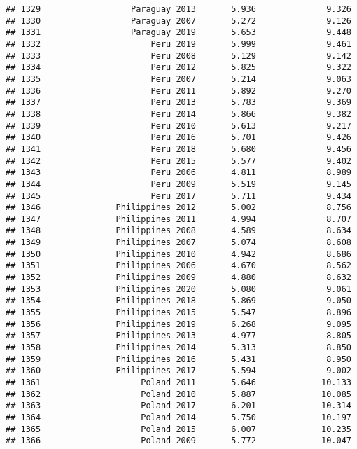 \documentclass[
]{article}
\begin{document}
\begin{verbatim}
## 1329                  Paraguay 2013       5.936              9.326
## 1330                  Paraguay 2007       5.272              9.126
## 1331                  Paraguay 2019       5.653              9.448
## 1332                      Peru 2019       5.999              9.461
## 1333                      Peru 2008       5.129              9.142
## 1334                      Peru 2012       5.825              9.322
## 1335                      Peru 2007       5.214              9.063
## 1336                      Peru 2011       5.892              9.270
## 1337                      Peru 2013       5.783              9.369
## 1338                      Peru 2014       5.866              9.382
## 1339                      Peru 2010       5.613              9.217
## 1340                      Peru 2016       5.701              9.426
## 1341                      Peru 2018       5.680              9.456
## 1342                      Peru 2015       5.577              9.402
## 1343                      Peru 2006       4.811              8.989
## 1344                      Peru 2009       5.519              9.145
## 1345                      Peru 2017       5.711              9.434
## 1346               Philippines 2012       5.002              8.756
## 1347               Philippines 2011       4.994              8.707
## 1348               Philippines 2008       4.589              8.634
## 1349               Philippines 2007       5.074              8.608
## 1350               Philippines 2010       4.942              8.686
## 1351               Philippines 2006       4.670              8.562
## 1352               Philippines 2009       4.880              8.632
## 1353               Philippines 2020       5.080              9.061
## 1354               Philippines 2018       5.869              9.050
## 1355               Philippines 2015       5.547              8.896
## 1356               Philippines 2019       6.268              9.095
## 1357               Philippines 2013       4.977              8.805
## 1358               Philippines 2014       5.313              8.850
## 1359               Philippines 2016       5.431              8.950
## 1360               Philippines 2017       5.594              9.002
## 1361                    Poland 2011       5.646             10.133
## 1362                    Poland 2010       5.887             10.085
## 1363                    Poland 2017       6.201             10.314
## 1364                    Poland 2014       5.750             10.197
## 1365                    Poland 2015       6.007             10.235
## 1366                    Poland 2009       5.772             10.047

\end{verbatim}
\end{document}
